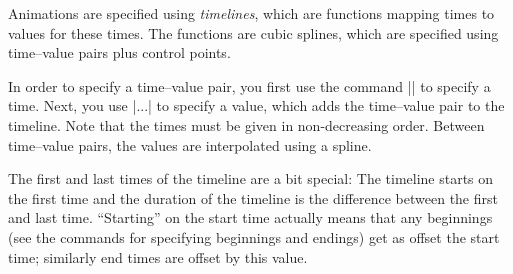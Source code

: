 Animations are specified using \emph{timelines}, which are functions mapping
times to values for these times. The functions are cubic splines, which are
specified using time--value pairs plus control points.

In order to specify a time--value pair, you first use the command
|\pgfsysanimkeytime| to specify a time. Next, you use |\pgfsysanimval...| to
specify a value, which adds the time--value pair to the timeline. Note that the
times must be given in non-decreasing order. Between time--value pairs, the
values are interpolated using a spline.

The first and last times of the timeline are a bit special: The timeline starts
on the first time and the duration of the timeline is the difference between
the first and last time. ``Starting'' on the start time actually means that any
beginnings (see the commands for specifying beginnings and endings) get as
offset the start time; similarly end times are offset by this value.

